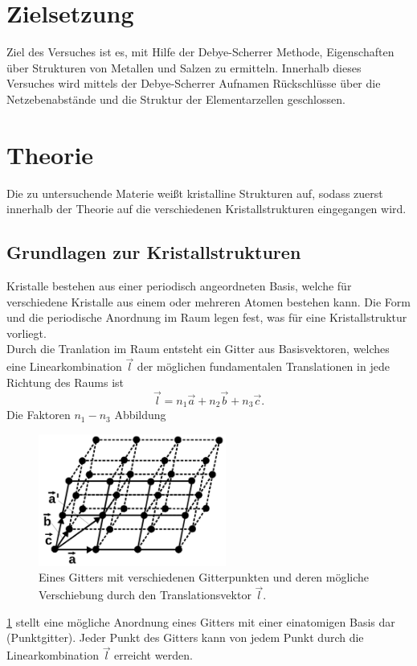 \section{Zielsetzung}
Ziel des Versuches ist es, mit Hilfe der Debye-Scherrer Methode, Eigenschaften
über Strukturen von Metallen und Salzen zu ermitteln. Innerhalb dieses
Versuches wird mittels der Debye-Scherrer Aufnamen Rückschlüsse über die
Netzebenabstände und die Struktur der Elementarzellen geschlossen.


\section{Theorie}
\label{sec:Theorie}
Die zu untersuchende Materie weißt kristalline Strukturen auf, sodass zuerst
innerhalb der Theorie auf die verschiedenen Kristallstrukturen eingegangen wird.\\
\subsection{Grundlagen zur Kristallstrukturen}
Kristalle bestehen aus einer periodisch angeordneten Basis, welche für
verschiedene Kristalle aus einem oder mehreren Atomen bestehen kann.
Die Form und die periodische Anordnung im Raum legen fest,
was für eine Kristallstruktur vorliegt. \\
Durch die Tranlation im Raum entsteht ein Gitter aus Basisvektoren, welches
eine Linearkombination $\vec l$ der möglichen fundamentalen Translationen in
jede Richtung des Raums ist
$$ \vec l = n_1 \vec a + n_2 \vec b + n_3 \vec c .$$
Die Faktoren $n_1-n_3 $
Abbildung
\begin{figure}
    \centering
    \includegraphics[width=0.55\textwidth]{ressources/gitter.png}
    \caption{Eines Gitters mit verschiedenen Gitterpunkten und deren mögliche
    Verschiebung durch den Translationsvektor $\vec l$\cite{skript}.}
    \label{fig_gitter}
\end{figure}
\ref{fig_gitter}
 stellt eine mögliche Anordnung eines Gitters mit
einer einatomigen Basis dar (Punktgitter). Jeder Punkt des Gitters kann von
jedem Punkt durch die Linearkombination $\vec l$ erreicht werden.
